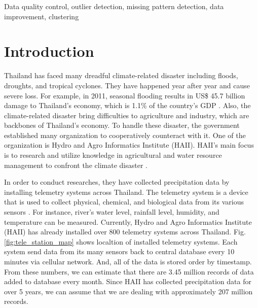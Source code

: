 \documentclass[conference]{IEEEtran}
\begin{document}
\begin{IEEEkeywords}
Data quality control, outlier detection, missing pattern detection, data improvement, clustering
\end{IEEEkeywords}

\IEEEpeerreviewmaketitle

\section{Introduction} \label{sec:intro}

Thailand has faced many dreadful climate-related disaster including floods, droughts, and tropical cyclones. They have happened year after year and cause severe loss. For example, in 2011, seasonal flooding results in US\$ 45.7 billion damage to Thailand's economy, which is 1.1\% of the country's GDP \cite{bangkokpost2011}. Also, the climate-related disaster bring difficulties to agriculture and industry, which are backbones of Thailand's economy. To handle these disaster, the government established many organization to cooperatively counteract with it. One of the organization is Hydro and Agro Informatics Institute (HAII). HAII's main focus is to research and utilize knowledge in agricultural and water resource management to confront the climate disaster \cite{haiibg}.

In order to conduct researches, they have collected precipitation data by installing telemetry systems across Thailand. The telemetry system is a device that is used to collect physical, chemical, and biological data from its various sensors \cite{haiits}. For instance, river's water level, rainfall level, humidity, and temperature can be measured. Currently, Hydro and Agro Informatics Institute (HAII) has already installed over 800 telemetry systems across Thailand. Fig. \ref{fig:tele_station_map} shows localtion of installed telemetry systems. Each system send data from its many sensors back to central database every 10 minutes via cellular network. And, all of the data is stored order by timestamp. From these numbers, we can estimate that there are 3.45 million records of data added to database every month. Since HAII has collected precipitation data for over 5 years, we can assume that we are dealing with approximately 207 million records.
\end{document}
